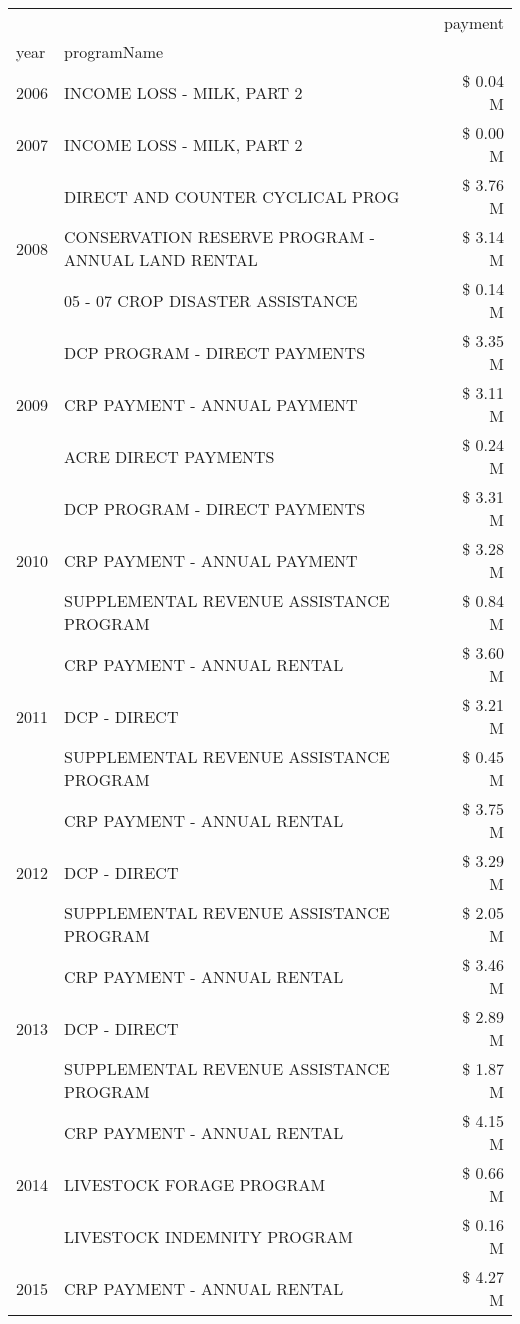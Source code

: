 \begin{tabular}{llr}
\toprule
 &  & payment \\
year & programName &  \\
\midrule
2006 & INCOME LOSS - MILK, PART 2 & \$ 0.04 M \\
\cline{1-3}
2007 & INCOME LOSS - MILK, PART 2 & \$ 0.00 M \\
\cline{1-3}
\multirow[t]{3}{*}{2008} & DIRECT AND COUNTER CYCLICAL PROG & \$ 3.76 M \\
 & CONSERVATION RESERVE PROGRAM - ANNUAL LAND RENTAL & \$ 3.14 M \\
 & 05 - 07 CROP DISASTER ASSISTANCE & \$ 0.14 M \\
\cline{1-3}
\multirow[t]{3}{*}{2009} & DCP PROGRAM - DIRECT PAYMENTS & \$ 3.35 M \\
 & CRP PAYMENT - ANNUAL PAYMENT & \$ 3.11 M \\
 & ACRE DIRECT PAYMENTS & \$ 0.24 M \\
\cline{1-3}
\multirow[t]{3}{*}{2010} & DCP PROGRAM - DIRECT PAYMENTS & \$ 3.31 M \\
 & CRP PAYMENT - ANNUAL PAYMENT & \$ 3.28 M \\
 & SUPPLEMENTAL REVENUE ASSISTANCE PROGRAM & \$ 0.84 M \\
\cline{1-3}
\multirow[t]{3}{*}{2011} & CRP PAYMENT - ANNUAL RENTAL & \$ 3.60 M \\
 & DCP - DIRECT & \$ 3.21 M \\
 & SUPPLEMENTAL REVENUE ASSISTANCE PROGRAM & \$ 0.45 M \\
\cline{1-3}
\multirow[t]{3}{*}{2012} & CRP PAYMENT - ANNUAL RENTAL & \$ 3.75 M \\
 & DCP - DIRECT & \$ 3.29 M \\
 & SUPPLEMENTAL REVENUE ASSISTANCE PROGRAM & \$ 2.05 M \\
\cline{1-3}
\multirow[t]{3}{*}{2013} & CRP PAYMENT - ANNUAL RENTAL & \$ 3.46 M \\
 & DCP - DIRECT & \$ 2.89 M \\
 & SUPPLEMENTAL REVENUE ASSISTANCE PROGRAM & \$ 1.87 M \\
\cline{1-3}
\multirow[t]{3}{*}{2014} & CRP PAYMENT - ANNUAL RENTAL & \$ 4.15 M \\
 & LIVESTOCK FORAGE PROGRAM & \$ 0.66 M \\
 & LIVESTOCK INDEMNITY PROGRAM & \$ 0.16 M \\
\cline{1-3}
\multirow[t]{3}{*}{2015} & CRP PAYMENT - ANNUAL RENTAL & \$ 4.27 M \\

\end{tabular}
